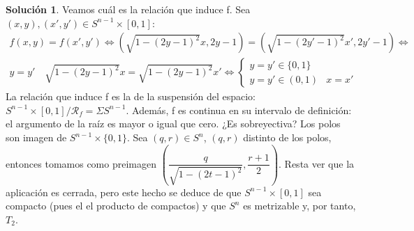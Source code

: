 \documentclass{article}
\theoremstyle{plain}
\theoremstyle{definition}
\newtheorem*{sol*}{Solución}
\begin{document}
\begin{sol*}
Veamos cuál es la relación que induce f. Sea $(x,y),(x',y')\in S^{n-1} \times [0,1]$:
\begin{gather*}
f(x,y) = f(x',y') \Leftrightarrow (\sqrt{1-(2y-1)^2}x, 2y-1) = (\sqrt{1-(2y'-1)^2}x', 2y'-1) \Leftrightarrow\\
y=y' \quad \sqrt{1-(2y-1)^2}x = \sqrt{1-(2y-1)^2}x' \Leftrightarrow
\begin{cases}
y=y'\in\{0,1\}&\\
y=y'\in (0,1) & x=x'
\end{cases}
\end{gather*}
La relación que induce f es la de la suspensión del espacio: $S^{n-1}\times[0,1]/\mathcal{R}_f = \Sigma S^{n-1}$. Además, f es continua en su intervalo de definición: el argumento de la raíz es mayor o igual que cero. ¿Es sobreyectiva? Los polos son imagen de $S^{n-1}\times\{0,1\}$. Sea $(q,r)\in S^n$, $(q,r)$ distinto de los polos, entonces tomamos como preimagen $\left(\dfrac{q}{\sqrt{1-(2t-1)^2}},\dfrac{r+1}{2}\right)$. 
\newline
Resta ver que la aplicación es cerrada, pero este hecho se deduce de que $S^{n-1}\times[0,1]$ sea compacto (pues el el producto de compactos) y que $S^{n}$ es metrizable y, por tanto, $T_2$.
\end{sol*}
\end{document}
